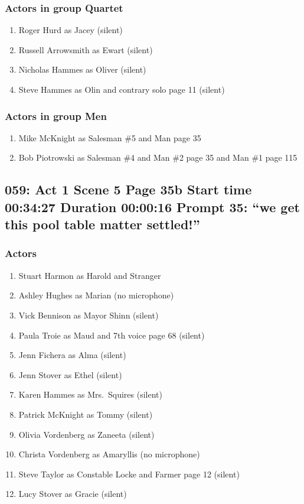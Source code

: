 \subsubsection{Actors in group Quartet}
\begin{enumerate}
\item Roger Hurd as Jacey (silent)
\item Russell Arrowsmith as Ewart (silent)
\item Nicholas Hammes as Oliver (silent)
\item Steve Hammes as Olin and contrary solo page 11 (silent)
\end{enumerate}
\subsubsection{Actors in group Men}
\begin{enumerate}
\item Mike McKnight as Salesman \#5 and Man page 35
\item Bob Piotrowski as Salesman \#4 and Man \#2 page 35 and Man \#1 page 115
\end{enumerate}


\subsection{059: Act 1 Scene 5 Page 35b Start time 00:34:27 Duration 00:00:16 Prompt 35: ``we get this pool table matter settled!''}

\subsubsection{Actors}
\begin{enumerate}
\item Stuart Harmon as Harold and Stranger
\item Ashley Hughes as Marian (no microphone)
\item Vick Bennison as Mayor Shinn (silent)
\item Paula Troie as Maud and 7th voice page 68 (silent)
\item Jenn Fichera as Alma (silent)
\item Jenn Stover as Ethel (silent)
\item Karen Hammes as Mrs.~Squires (silent)
\item Patrick McKnight as Tommy (silent)
\item Olivia Vordenberg as Zaneeta (silent)
\item Christa Vordenberg as Amaryllis (no microphone)
\item Steve Taylor as Constable Locke and Farmer page 12 (silent)
\item Lucy Stover as Gracie (silent)
\end{enumerate}
